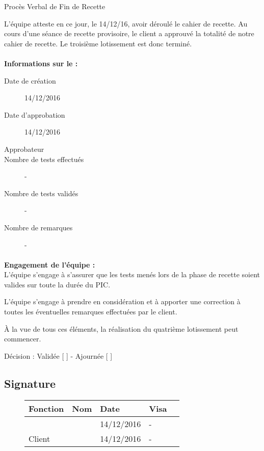 \documentclass[asi, sansVersion]{picInsa}
\begin{document}
 
 \begin{center}
  \LARGE{}
    Procès Verbal de Fin de Recette\\
 \end{center}
 
 \normalsize{}
 
L'équipe \nomEquipe{} atteste en ce jour, le 14/12/16, avoir déroulé le cahier de recette.
Au cours d'une séance de recette provisoire, le client a approuvé la totalité de notre cahier de recette. Le troisième lotissement est donc terminé.


\paragraph{}
\textbf{Informations sur le \CDR :}

\begin{description}
  \item[Date de création]14/12/2016
  \item[Date d'approbation]14/12/2016
  \item[Approbateur]\nomClient
  \item[Nombre de tests effectués]-
  \item[Nombre de tests validés]-
  \item[Nombre de remarques]-
\end{description}


\paragraph{}
\textbf{Engagement de l'équipe :}\\


L'équipe \nomEquipe{} s'engage à s'assurer que les tests menés lors de la phase de recette soient valides sur toute la durée du PIC.


L'équipe \nomEquipe{} s'engage à prendre en considération et à apporter une correction à toutes les éventuelles remarques effectuées par le client.

À la vue de tous ces éléments, la réalisation du quatrième lotissement peut commencer.

\begin{center}
Décision : Validée [ \checkmark{} ] - Ajournée [ ]
\end{center}

\subsection*{Signature}
\begin{figure}[H]
		\centering
		\begin{tabularx}{17cm}{|p{4cm}|X|X|X|X|}
		\hline
		\rowcolor[gray]{0.85} Fonction & Nom & Date & Visa \\
		\hline
		\CP{} & \Pierre{} & 14/12/2016 & - \\
		\hline
		Client & \nomClient & 14/12/2016 & - \\
		\hline
		\end{tabularx}
\end{figure}
\end{document}
